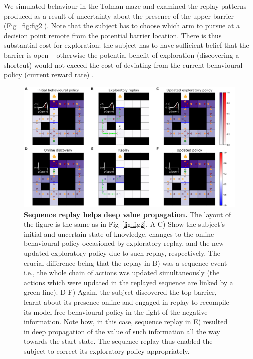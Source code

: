 We simulated behaviour in the Tolman maze and examined the replay patterns  produced as a result of  uncertainty about the presence of the upper barrier (Fig~\ref{fig:fig2}). Note that the subject has to choose which arm to pursue at a decision point remote from the potential barrier location. There is thus substantial cost for exploration: the subject
has to have sufficient belief that the barrier is open  -- otherwise the potential benefit of exploration (discovering a shortcut) would not exceed the cost of deviating from the current behavioural policy (current reward rate) \parencite{nivTonicDopamineOpportunity2007}.

\begin{figure}[h!]
    \centering
    \includegraphics[width=1\textwidth]{Figures/fig3.png}
    \caption{\footnotesize \textbf{Sequence replay helps deep value propagation.} The layout of the figure is the same as in Fig~\ref{fig:fig2}. A-C) Show the subject's initial and uncertain state of knowledge, changes to the online behavioural policy occasioned by exploratory replay, and the new updated exploratory policy due to such replay, respectively. The crucial difference being that the replay in B) was  a sequence event -- i.e., the whole chain of actions was updated simultaneously (the actions which were updated in the replayed sequence are linked by a green line). D-F) Again, the subject discovered the top barrier, learnt about its presence online and engaged in replay to recompile its model-free behavioural policy in the light of the negative information. Note how, in this case, sequence replay in E) resulted in deep propagation of the value of such information all the way towards the start state. The sequence replay thus enabled the subject to  correct its exploratory policy appropriately.}
    \label{fig:fig3}
\end{figure}

